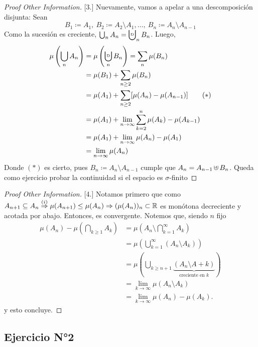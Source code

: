 \begin{proof}[Proof Other Information][3.]
	Nuevamente, vamos a apelar a una descomposición disjunta: Sean
	\[ B_1 \coloneq A_1,\ B_2 \coloneq A_2 \setminus A_1,\dots,\ B_n \coloneq A_n \setminus A_{n-1} \]
	Como la sucesión es creciente, $\bigcup_{n} A_n = \bigcupd_{n} B_n$. Luego,
	\begin{align*}
		\mu \left( \bigcup_{n} A_n \right) & = \mu \left( \bigcupd_{n} B_n \right) = \sum_{n} \mu(B_n) \\
		& = \mu(B_1) + \sum_{n\geq 2} \mu(B_n) \\
		& = \mu(A_1) + \sum_{n\geq 2} [\mu(A_n)-\mu(A_{n-1})] \tag{$*$} \\
		& = \mu(A_1) + \lim_{n \to \infty} \sum_{k=2}^{n} \mu(A_k)-\mu(A_{k-1}) \\
		& = \mu(A_1) + \lim_{n \to \infty} \mu(A_n) - \mu(A_1) \\
		& = \lim_{n \to \infty} \mu(A_n)
	\end{align*}
	Donde $(*)$ es cierto, pues $B_n \coloneq A_n \setminus A_{n-1}$ cumple que $A_n = A_{n-1} \cupd B_n$. Queda como ejercicio probar la continuidad si el espacio es $\sigma$-finito
\end{proof}

\begin{proof}[Proof Other Information][4.]
	Notamos primero que como $A_{n+1} \subseteq A_n \stackrel{(i)}{\Rightarrow} \mu(A_{n+1}) \leq \mu(A_n) \Rightarrow (\mu(A_n))_n \subset \mathbb{R}$ es monótona decreciente y acotada por abajo. Entonces, es convergente. Notemos que, siendo $n$ fijo
	\begin{align*}
		\mu(A_n)-\mu\left(\bigcap_{k\geq 1} A_k \right) & = \mu\left( A_n \setminus \bigcap_{k=1}^{\infty} A_k \right) \\
		& = \mu\left( \bigcup_{k=1}^{\infty}(A_n \setminus A_k) \right) \\
		& = \mu \left( \bigcup_{k\geq n+1} \underbrace{(A_n \setminus A+k)}_{\text{creciente en } k} \right) \\
		& = \lim_{k \to \infty} \mu(A_n \setminus A_k) \\
		& = \lim_{k \to \infty} \mu(A_n) - \mu(A_k)
	.\end{align*}
	y esto concluye.
\end{proof}

\subsection*{Ejercicio N°2}

